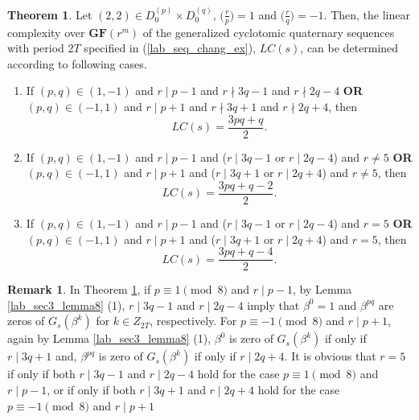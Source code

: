 \documentclass{mcom-l}
\theoremstyle{definition}
\newtheorem{sec3_remark2}[sec3_remark1]{Remark}
\newtheorem{sec3thm1x}[sec3thm1]{Theorem}
\numberwithin{equation}{section}
\begin{document}
   \begin{sec3thm1x}\label{lab_MainThorem_01x}
     Let $ (2,2) \in  D_{0}^{(p)}\times D_{0}^{(q)}$, $ \bigl(\tfrac{r}{p}\bigr) =1 $ and $ \bigl(\tfrac{r}{q}\bigr) =-1 $. Then, the linear complexity over $ \mathbf{GF}(r^{m}) $ of the generalized cyclotomic quaternary sequences with period $ 2T $ specified in (\ref{lab_seq_chang_ex}), $  LC(s) $, can be determined according to following cases.
      \begin{enumerate} \item If $ (p,q)\in (1,-1) $ and $ r\mid p-1 $ and $ r\nmid 3q-1 $ and $ r\nmid 2q-4 $ \textbf{OR} $ (p,q)\in (-1,1) $ and $ r\mid p+1 $ and $ r\nmid 3q+1 $ and $ r\nmid 2q+4 $, then
      \begin{equation*}
         LC(s)=\frac{3pq+q}{2}.
      \end{equation*}
       \item If $ (p,q)\in (1,-1) $ and $ r\mid p-1 $ and ($ r\mid 3q-1 $ or $ r\mid 2q-4 $) and $ r\ne 5$ \textbf{OR} $ (p,q)\in (-1,1) $ and $ r\mid p+1 $ and ($ r\mid 3q+1 $ or $ r\mid 2q+4 $) and $ r\ne 5$, then
          \begin{equation*}
          LC(s)=\frac{3pq+q-2}{2}.
           \end{equation*}
       \item If $ (p,q)\in (1,-1) $ and $ r\mid p-1 $ and ($ r\mid 3q-1 $ or $ r\mid 2q-4 $) and $ r= 5$ \textbf{OR} $ (p,q)\in (-1,1) $ and $ r\mid p+1 $ and ($ r\mid 3q+1 $ or $ r\mid 2q+4 $) and $ r= 5$, then
            \begin{equation*}
              LC(s)=\frac{3pq+q-4}{2}.
            \end{equation*}
            \end{enumerate}
     \end{sec3thm1x}
     \begin{sec3_remark2}\label{Lab_sec3_remark2_A_thm2}
     In Theorem \ref{lab_MainThorem_01x}, if $ p\equiv 1\pmod 8 $ and $ r\mid p-1 $, by Lemma \ref{lab_sec3_lemma8} (1), $ r\mid 3q-1 $ and $ r\mid 2q-4 $ imply that $ \beta^{0}=1 $ and $ \beta^{pq} $ are zeros of  $ G_{s}(\beta^{k}) $ for $ k\in Z_{2T} $, respectively. For $ p\equiv -1\pmod 8 $ and $ r\mid p+1 $, again by Lemma \ref{lab_sec3_lemma8} (1), $ \beta^{0} $ is zero of $ G_{s}(\beta^{k}) $ if only if  $ r\mid 3q+1 $ and, $ \beta^{pq} $ is zero of $ G_{s}(\beta^{k}) $ if only if $ r\mid 2q+4 $. It is obvious that $ r=5 $ if only if both $ r\mid 3q-1 $ and $ r\mid 2q-4 $ hold for the case $ p\equiv 1\pmod 8 $ and $ r\mid p-1 $, or if only if both $ r\mid 3q+1 $ and $ r\mid 2q+4 $ hold for the case $ p\equiv -1\pmod 8 $ and $ r\mid p+1 $
     \end{sec3_remark2}
\end{document}
